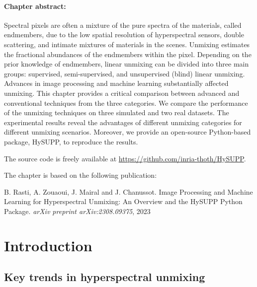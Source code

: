 \begin{tcolorbox}[colback=gray!5!white,colframe=gray!75!black]

        \paragraph{Chapter abstract:}
 Spectral pixels are often a mixture of the pure spectra of the materials, called endmembers, due to the low spatial resolution of hyperspectral sensors, double scattering, and intimate mixtures of materials in the scenes. 
 Unmixing estimates the fractional abundances of the endmembers within the pixel. 
 Depending on the prior knowledge of endmembers, linear unmixing can be divided into three main groups: supervised, semi-supervised, and unsupervised (blind) linear unmixing.
 Advances in image processing and machine learning substantially affected unmixing. 
 This chapter provides a critical comparison between advanced and conventional techniques from the three categories. 
 We compare the performance of the unmixing techniques on three simulated and two real datasets.
 The experimental results reveal the advantages of different unmixing categories for different unmixing scenarios.
 Moreover, we provide an open-source Python-based package, HySUPP, to reproduce the results. 

        \vspace{1em}
        The source code is freely available at \href{https://github.com/inria-thoth/HySUPP}{https://github.com/inria-thoth/HySUPP}.
        
        \vspace{1em}
        The chapter is based on the following publication:

        \vspace{0.5em}

        B. Rasti, A. Zouaoui, J. Mairal and J. Chanussot. Image Processing and Machine Learning for Hyperspectral Unmixing: An Overview and the HySUPP Python Package. \emph{arXiv preprint arXiv:2308.09375}, 2023

    \end{tcolorbox}

\newpage
\minitoc

\section{Introduction}

\subsection{Key trends in hyperspectral unmixing}

